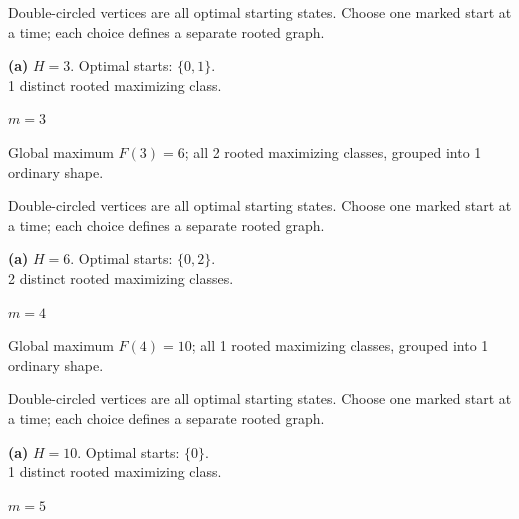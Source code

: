 \documentclass[11pt,a4paper]{article}
\begin{document}
Double-circled vertices are all optimal starting states. Choose one marked start at a time; each choice defines a separate rooted graph.\par\vspace{3mm}
\begin{minipage}[t]{.94\textwidth}\centering
\resizebox{10.3cm}{!}{}\par
\small\textbf{(a)} $H=3$. Optimal starts: $\{0, 1\}$.\\1 distinct rooted maximizing class.\par\end{minipage}
\clearpage
{\LARGE\bfseries $m=3$}\par\vspace{3mm}
Global maximum $F(3)=6$; all 2 rooted maximizing classes, grouped into 1 ordinary shape.\par\vspace{2mm}
Double-circled vertices are all optimal starting states. Choose one marked start at a time; each choice defines a separate rooted graph.\par\vspace{3mm}
\begin{minipage}[t]{.94\textwidth}\centering
\resizebox{10.3cm}{!}{}\par
\small\textbf{(a)} $H=6$. Optimal starts: $\{0, 2\}$.\\2 distinct rooted maximizing classes.\par\end{minipage}
\clearpage
{\LARGE\bfseries $m=4$}\par\vspace{3mm}
Global maximum $F(4)=10$; all 1 rooted maximizing classes, grouped into 1 ordinary shape.\par\vspace{2mm}
Double-circled vertices are all optimal starting states. Choose one marked start at a time; each choice defines a separate rooted graph.\par\vspace{3mm}
\begin{minipage}[t]{.94\textwidth}\centering
\resizebox{10.3cm}{!}{}\par
\small\textbf{(a)} $H=10$. Optimal starts: $\{0\}$.\\1 distinct rooted maximizing class.\par\end{minipage}
\clearpage
{\LARGE\bfseries $m=5$}\par\vspace{3mm}
\end{document}
